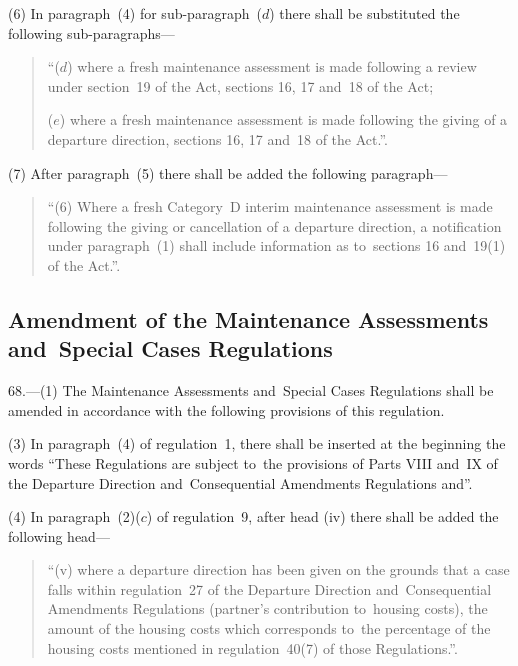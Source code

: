 \documentclass[12pt,a4paper]{article}
\begin{document}
(6) In paragraph~(4) for sub-paragraph~($d$) there shall be substituted the
following sub-paragraphs—
\begin{quotation}
“($d$) where a fresh maintenance assessment is made following a review under
section~19 of the Act, sections 16, 17 and~18 of the Act;

($e$) where a fresh maintenance assessment is made following the giving of a
departure direction, sections 16, 17 and~18 of the Act.”.
\end{quotation}

(7) After paragraph~(5) there shall be added the following paragraph—
\begin{quotation}
“(6) Where a fresh Category~D interim maintenance assessment is made following
the giving or cancellation of a departure direction, a notification under
paragraph~(1) shall include information as to~sections 16 and~19(1) of the
Act.”.
\end{quotation}

\subsection[68. Amendment of the Maintenance Assessments and~Special Cases Regulations]{\sloppy Amendment of the Maintenance Assessments and~Special Cases Regulations}

68.—(1)
The Maintenance Assessments and~Special Cases Regulations shall be amended in
accordance with the following provisions of this regulation.



(3) In paragraph~(4) of regulation~1, there shall be inserted at the beginning
the words “These Regulations are subject to~the provisions of Parts VIII and~IX
of the Departure Direction and~Consequential Amendments Regulations and”.

(4) In paragraph~(2)($c$) of regulation~9, after head (iv) there shall be added
the following head—
\begin{quotation}
“(v) where a departure direction has been given on the grounds that a case falls
within regulation~27 of the Departure Direction and~Consequential Amendments
Regulations (partner’s contribution to~housing costs), the amount of the housing
costs which corresponds to~the percentage of the housing costs mentioned in
regulation~40(7) of those Regulations.”.
\end{quotation}
\end{document}
